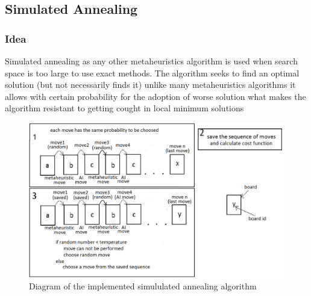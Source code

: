 \documentclass[pdftex]{article}
\begin{document}
\subsection{Simulated Annealing}
\label{sec:annealing}

\subsubsection{Idea}
Simulated annealing as any other metaheuristics algorithm is used when search space is too large to use exact methods. The algorithm seeks to find an optimal solution (but not necessarily finds it) unlike many metaheuristics algorithms it allows with certain probability for the adoption of worse solution what makes the algorithm resistant to getting cought in local minimum solutions

\begin{figure}[!htb]
	\centering
	\includegraphics[width=1\textwidth]{annealing/annealingSchema.png} 
	\caption{Diagram of the implemented simululated annealing algorithm}
	\label{fig:annealingSchema}
\end{figure}
\end{document}
